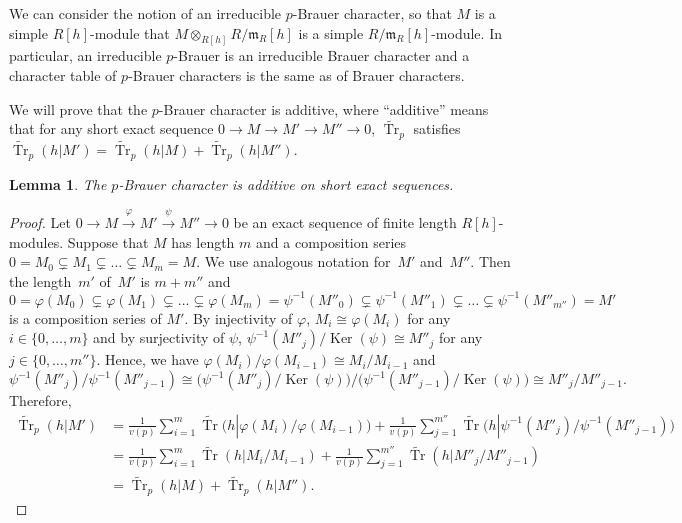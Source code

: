 \documentclass[10pt,a4paper]{amsart}
\numberwithin{equation}{section}
\newtheorem{Lemma}[Theorem]{Lemma}
\begin{document}
We can consider the notion of an irreducible $p$-Brauer character, so that $M$ is a simple $R[h]$-module that $M\otimes_{R[h]} R/\mathfrak{m}_R[h]$ is a simple $R/\mathfrak{m}_R[h]$-module. In particular, an irreducible $p$-Brauer is an irreducible Brauer character and a character table of $p$-Brauer characters is the same as of Brauer characters.

We will prove that the $p$-Brauer character is additive, where ``additive'' means that for any short exact sequence $0\rightarrow M\rightarrow M'\rightarrow M''\rightarrow 0$, $\widetilde{\operatorname{Tr}}_p$ satisfies $\widetilde{\operatorname{Tr}}_p(h|M')=\widetilde{\operatorname{Tr}}_p(h|M)+\widetilde{\operatorname{Tr}}_p(h|M'')$.

\begin{Lemma}\label{additive}
The $p$-Brauer character is additive on short exact sequences.
\end{Lemma}

\begin{proof}
Let $0\rightarrow M\xrightarrow{\varphi} M'\xrightarrow{\psi} M''\rightarrow 0$ be an exact sequence of finite length $R[h]$-modules. Suppose that $M$ has length $m$ and a composition series $0=M_0\subsetneq M_1\subsetneq \dots \subsetneq M_m=M$. We use analogous notation for~$M'$ and~$M''$. Then the length~$m'$ of~$M'$ is $m+m''$ and
\[
0=\varphi(M_0)\subsetneq \varphi(M_1)\subsetneq \dots \subsetneq \varphi(M_m)=\psi^{-1}(M''_0)\subsetneq \psi^{-1}(M''_1)\subsetneq \dots \subsetneq \psi^{-1}(M''_{m''})=M'
\]
 is a composition series of $M'$. By injectivity of $\varphi$, $M_i\cong \varphi(M_i)$ for any $i \in \{0, \dots,m\}$ and by surjectivity of $\psi$, $\psi^{-1}(M''_j)/\operatorname{Ker}(\psi)\cong M''_j$ for any $j \in \{0, \dots,m''\}$. Hence, we have $\varphi(M_i)/\varphi(M_{i-1})\cong M_i/M_{i-1}$ and
\[
\psi^{-1}(M''_j)/\psi^{-1}(M''_{j-1})\cong \big(\psi^{-1}(M''_j)/\operatorname{Ker}(\psi)\big)/\big(\psi^{-1}(M''_{j-1})/\operatorname{Ker}(\psi)\big) \cong M''_j/M''_{j-1}.
\]
 Therefore,
\begin{align*}
\widetilde{\operatorname{Tr}}_p(h|M')&=\frac{1}{v(p)}\sum_{i=1}^m\widetilde{\operatorname{Tr}}\big(h|\varphi(M_i)/\varphi(M_{i-1})\big) +\frac{1}{v(p)}\sum_{j=1}^{m''}\widetilde{\operatorname{Tr}}\big(h|\psi^{-1}(M''_j)/\psi^{-1}(M''_{j-1})\big) \\
 &=\frac{1}{v(p)}\sum_{i=1}^m\widetilde{\operatorname{Tr}}(h|M_i/M_{i-1})+\frac{1}{v(p)}\sum_{j=1}^{m''}\widetilde{\operatorname{Tr}}(h|M''_j/M''_{j-1}) \\
 &=\widetilde{\operatorname{Tr}}_p(h|M)+\widetilde{\operatorname{Tr}}_p(h|M'').\tag*{\qed}
\end{align*}\renewcommand{\qed}{}
\end{proof}
\end{document}
